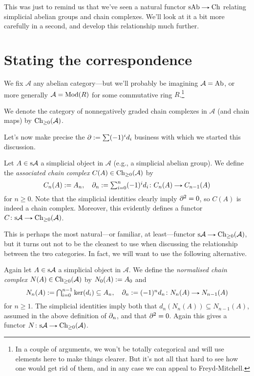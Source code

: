 This was just to remind us that we've seen a natural functor $\s\Ab
\to \Ch$ relating simplicial abelian groups and chain complexes. We'll
look at it a bit more carefully in a second, and develop this
relationship much further.


\renewcommand{\A}{\mathcal{A}}

\section{Stating the correspondence}

We fix $\A$ any abelian category---but we'll probably be imagining $\A
= \Ab$, or more generally $\A = \Mod(R)$ for some commutative
ring $R$.\footnote{In a couple of arguments, we won't be totally
  categorical and will use elements here to make things clearer. But
  it's not all that hard to see how one would get rid of them, and in
  any case we can appeal to Freyd-Mitchell.}

\begin{notation}
  We denote the category of nonnegatively graded chain complexes in
  $\A$ (and chain maps) by $\Ch_{\ge 0}(\A)$.
\end{notation}

Let's now make precise the $\partial \mathrel{:=} \sum (-1)^i d_i$ business
with which we started this discussion.

\begin{definition}
  Let $A \in \s\A$ a simplicial object in $\A$ (e.g., a simplicial
  abelian group). We define the \textit{associated chain complex}
  $C(A) \in \Ch_{\ge 0}(\A)$ by
  \[
  \textstyle{C_n(A) \ce A_n, \quad \del_n \ce \sum_{i=0}^n
    (-1)^i d_i \c C_n(A) \to C_{n-1}(A)}
  \]
  for $n \ge 0$. Note that the simplicial identities clearly imply
  $\partial^2 = 0$, so $C(A)$ is indeed a chain complex. Moreover, this
  evidently defines a functor $C \c \s\A \to \Ch_{\ge 0}(\A)$.
\end{definition}

This is perhaps the most natural---or familiar, at least---functor
$\s\A \to \Ch_{\ge 0}(\A)$, but it turns out not to be the cleanest to
use when discussing the relationship between the two categories. In
fact, we will want to use the following alternative.

\begin{definition}
  Again let $A \in \s\A$ a simplicial object in $\A$. We define the
  \textit{normalised chain complex} $N(A) \in \Ch_{\ge 0}(\A)$ by
  $N_0(A) \mathrel{:=} A_0$ and
  \[
  \textstyle{N_n(A) \ce
    \bigcap_{i=0}^{n-1} \ker(d_i) \subseteq A_n, \quad \del_n
    \ce (-1)^n d_n \c N_n(A) \to N_{n-1}(A)}
  \]
  for $n \ge 1$. The simplicial identities imply both that
  $d_n(N_n(A)) \subseteq N_{n-1}(A)$, assumed in the above definition
  of $\partial_n$, and that $\partial^2 = 0$. Again this gives a functor $N \c
  \s\A \to \Ch_{\ge 0}(\A)$.
\end{definition}

